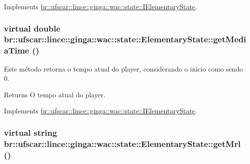 Implements \hyperlink{classbr_1_1ufscar_1_1lince_1_1ginga_1_1wac_1_1state_1_1IElementaryState_a22990483a86a4fdb0d8203c2f96f701c}{br::ufscar::lince::ginga::wac::state::IElementaryState}.

\hypertarget{classbr_1_1ufscar_1_1lince_1_1ginga_1_1wac_1_1state_1_1ElementaryState_a05bc58afddd1713b6300f383b7e26826}{
\subsubsection[{getMediaTime}]{\setlength{\rightskip}{0pt plus 5cm}virtual double br::ufscar::lince::ginga::wac::state::ElementaryState::getMediaTime ()}}
\label{classbr_1_1ufscar_1_1lince_1_1ginga_1_1wac_1_1state_1_1ElementaryState_a05bc58afddd1713b6300f383b7e26826}


Este método retorna o tempo atual do player, considerando o inicio como sendo 0. 

\begin{DoxyReturn}{Returns}
O tempo atual do player. 
\end{DoxyReturn}


Implements \hyperlink{classbr_1_1ufscar_1_1lince_1_1ginga_1_1wac_1_1state_1_1IElementaryState_a2dd09dc8dcee4eb6a4b23fe4d1f001ad}{br::ufscar::lince::ginga::wac::state::IElementaryState}.

\hypertarget{classbr_1_1ufscar_1_1lince_1_1ginga_1_1wac_1_1state_1_1ElementaryState_a3714512e115e6e66bfa55eb5694951ec}{
\subsubsection[{getMrl}]{\setlength{\rightskip}{0pt plus 5cm}virtual string br::ufscar::lince::ginga::wac::state::ElementaryState::getMrl ()}}
\label{classbr_1_1ufscar_1_1lince_1_1ginga_1_1wac_1_1state_1_1ElementaryState_a3714512e115e6e66bfa55eb5694951ec}


